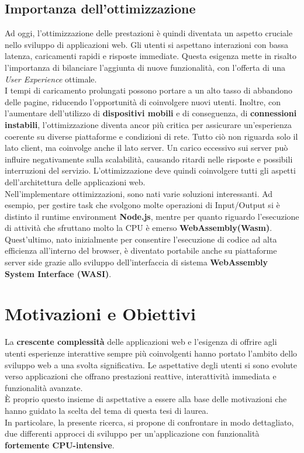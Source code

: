 \subsection{Importanza dell'ottimizzazione}
Ad oggi, l'ottimizzazione delle prestazioni è quindi diventata un aspetto cruciale nello sviluppo di applicazioni web.
Gli utenti si aspettano interazioni con bassa latenza, caricamenti rapidi e risposte immediate.
Questa esigenza mette in risalto l'importanza di bilanciare l'aggiunta di nuove funzionalità, con l'offerta di una \emph{User Experience} ottimale.
\\I tempi di caricamento prolungati possono portare a un alto tasso di abbandono delle pagine, riducendo l'opportunità di coinvolgere nuovi utenti.
Inoltre, con l'aumentare dell'utilizzo di \textbf{dispositivi mobili} e di conseguenza, di \textbf{connessioni instabili}, l'ottimizzazione diventa ancor più critica per assicurare un'esperienza coerente su diverse piattaforme e condizioni di rete.
Tutto ciò non riguarda solo il lato client, ma coinvolge anche il lato server. 
Un carico eccessivo sui server può influire negativamente sulla scalabilità, causando ritardi nelle risposte e possibili interruzioni del servizio.
L'ottimizzazione deve quindi coinvolgere tutti gli aspetti dell'architettura delle applicazioni web.
\\Nell'implementare ottimizzazioni, sono nati varie soluzioni interessanti. 
Ad esempio, per gestire task che svolgono molte operazioni di Input/Output si è distinto il runtime environment \textbf{Node.js}\cite*{nodeHome}, mentre per quanto riguardo l'esecuzione di attività che sfruttano molto la CPU è emerso \textbf{WebAssembly(Wasm)}\cite*{wasmHome}.
Quest'ultimo, nato inizialmente per consentire l'esecuzione di codice ad alta efficienza all'interno del browser, è diventato portabile anche su piattaforme server side grazie allo sviluppo dell'interfaccia di sistema \textbf{WebAssembly System Interface (WASI)}\cite*{wasiHome}.


\section{Motivazioni e Obiettivi}
\label{sec:Obiettivi}
La \textbf{crescente complessità} delle applicazioni web e l'esigenza di offrire agli utenti esperienze interattive sempre più coinvolgenti hanno portato l'ambito dello sviluppo web a una svolta significativa.
Le aspettative degli utenti si sono evolute verso applicazioni che offrano prestazioni reattive, interattività immediata e funzionalità avanzate.
\\È proprio questo insieme di aspettative a essere alla base delle motivazioni che hanno guidato la scelta del tema di questa tesi di laurea.
\\In particolare, la presente ricerca, si propone di confrontare in modo dettagliato, due differenti approcci di sviluppo per un'applicazione con funzionalità \textbf{fortemente CPU-intensive}.

